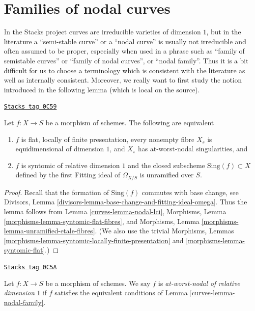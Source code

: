 \section{Families of nodal curves}
\label{curves-section-families-nodal}
In the Stacks project curves are irreducible varieties of dimension $1$,
but in the literature a ``semi-stable curve'' or a ``nodal curve'' is
usually not irreducible and often assumed to be proper, especially
when used in a phrase such as ``family of semistable curves'' or
``family of nodal curves'', or ``nodal family''. Thus it is a bit
difficult for us to choose a terminology which is consistent with the
literature as well as internally consistent. Moreover, we really want
to first study the notion introduced in the following lemma (which is
local on the source).

\begin{lemma}
\label{curves-lemma-nodal-family}
\href{https://stacks.math.columbia.edu/tag/0C59}{\texttt{Stacks tag 0C59}}

Let $f : X \to S$ be a morphism of schemes. The following are equivalent
\begin{enumerate}
\item $f$ is flat, locally of finite presentation, every nonempty fibre
$X_s$ is equidimensional of dimension $1$, and $X_s$ has
at-worst-nodal singularities, and
\item $f$ is syntomic of relative dimension $1$ and the closed subscheme
$\text{Sing}(f) \subset X$ defined by the first Fitting ideal of
$\Omega_{X/S}$ is unramified over $S$.
\end{enumerate}
\end{lemma}

\begin{proof}

Recall that the formation of $\text{Sing}(f)$ commutes with base
change, see Divisors, Lemma
\ref{divisors-lemma-base-change-and-fitting-ideal-omega}.
Thus the lemma follows from Lemma \ref{curves-lemma-nodal-lci},
Morphisms, Lemma \ref{morphisms-lemma-syntomic-flat-fibres}, and
Morphisms, Lemma \ref{morphisms-lemma-unramified-etale-fibres}.
(We also use the trivial
Morphisms, Lemmas \ref{morphisms-lemma-syntomic-locally-finite-presentation}
and \ref{morphisms-lemma-syntomic-flat}.)
\end{proof}

\begin{definition}
\label{curves-definition-nodal-family}
\href{https://stacks.math.columbia.edu/tag/0C5A}{\texttt{Stacks tag 0C5A}}

Let $f : X \to S$ be a morphism of schemes. We say $f$ is
{\it at-worst-nodal of relative dimension $1$} if $f$ satisfies
the equivalent conditions of Lemma \ref{curves-lemma-nodal-family}.
\end{definition}


